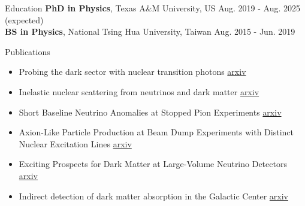 \documentclass{resume}
\begin{document}
\vspace{-1.5em}
\begin{rSection}{Education}
\vspace{-0.25em}
{\bf PhD in Physics}, Texas A\&M University, US \hfill {Aug. 2019 - Aug. 2025 (expected)} \\
{\bf BS in Physics}, National Tsing Hua University, Taiwan \hfill {Aug. 2015 - Jun. 2019}
\end{rSection}


\vspace{-0.5em}
\begin{rSection}{Publications}
    \begin{itemize}
        \item Probing the dark sector with nuclear transition photons \hfill \href{https://arxiv.org/pdf/2302.10250.pdf}{arxiv}
        \item Inelastic nuclear scattering from neutrinos and dark matter \hfill \href{https://arxiv.org/pdf/2206.08590.pdf}{arxiv}
        \item Short Baseline Neutrino Anomalies at Stopped Pion Experiments \hfill \href{https://arxiv.org/abs/2310.13194}{arxiv}
        \item Axion-Like Particle Production at Beam Dump Experiments with Distinct Nuclear Excitation Lines \hfill \href{https://arxiv.org/pdf/2207.13659.pdf}{arxiv}
        \item Exciting Prospects for Dark Matter at Large-Volume Neutrino Detectors \hfill \href{https://arxiv.org/abs/2402.04184}{arxiv}
        \item Indirect detection of dark matter absorption in the Galactic Center \hfill \href{https://arxiv.org/abs/2404.17418}{arxiv}
    \end{itemize}
\end{rSection}
\end{document}
